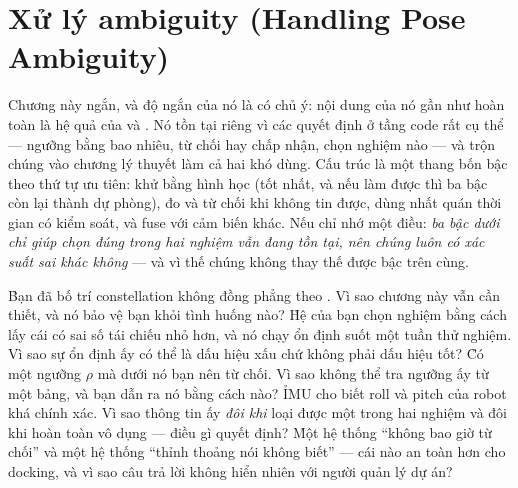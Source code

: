 \documentclass[../../marker.tex]{subfiles}
\begin{document}
\chapter{Xử lý ambiguity (Handling Pose Ambiguity)}

\begin{tomtat}
Chương này ngắn, và độ ngắn của nó là có chủ ý: nội dung của nó gần như hoàn toàn là hệ quả của  và . Nó tồn tại riêng vì các quyết định ở tầng code rất cụ thể --- ngưỡng bằng bao nhiêu, từ chối hay chấp nhận, chọn nghiệm nào --- và trộn chúng vào chương lý thuyết làm cả hai khó dùng. Cấu trúc là một thang bốn bậc theo thứ tự ưu tiên: khử bằng hình học (tốt nhất, và nếu làm được thì ba bậc còn lại thành dự phòng), đo và từ chối khi không tin được, dùng nhất quán thời gian có kiểm soát, và fuse với cảm biến khác. Nếu chỉ nhớ một điều: \emph{ba bậc dưới chỉ giúp \emph{chọn đúng} trong hai nghiệm vẫn đang tồn tại, nên chúng luôn có xác suất sai khác không} --- và vì thế chúng không thay thế được bậc trên cùng.
\end{tomtat}

\begin{nentang}
\end{nentang}

\begin{khoigoi}
\h{Bạn đã bố trí constellation không đồng phẳng theo . Vì sao chương này vẫn cần thiết, và nó bảo vệ bạn khỏi tình huống nào?}
\h{Hệ của bạn chọn nghiệm bằng cách lấy cái có sai số tái chiếu nhỏ hơn, và nó chạy ổn định suốt một tuần thử nghiệm. Vì sao sự ổn định ấy có thể là dấu hiệu xấu chứ không phải dấu hiệu tốt?}
\h{Có một ngưỡng \(\rho\) mà dưới nó bạn nên từ chối. Vì sao không thể tra ngưỡng ấy từ một bảng, và bạn dẫn ra nó bằng cách nào?}
\h{IMU cho biết roll và pitch của robot khá chính xác. Vì sao thông tin ấy \emph{đôi khi} loại được một trong hai nghiệm và đôi khi hoàn toàn vô dụng --- điều gì quyết định?}
\h{Một hệ thống ``không bao giờ từ chối'' và một hệ thống ``thỉnh thoảng nói không biết'' --- cái nào an toàn hơn cho docking, và vì sao câu trả lời không hiển nhiên với người quản lý dự án?}
\end{khoigoi}
\end{document}

